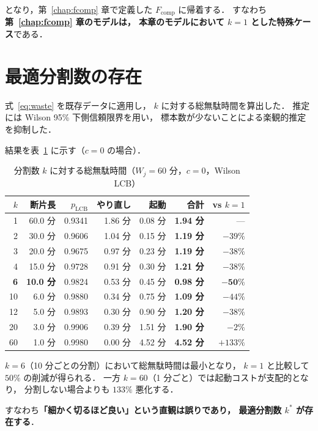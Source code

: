 \documentclass[11pt,a4paper]{ltjsreport}
\newcommand{\Fcomp}{F_{\mathrm{comp}}}
\begin{document}
となり，第~\ref{chap:fcomp} 章で定義した $\Fcomp$ に帰着する．
すなわち\textbf{第~\ref{chap:fcomp} 章のモデルは，
本章のモデルにおいて $k=1$ とした特殊ケース}である．

\section{最適分割数の存在}
\label{sec:kstar}

式~\eqref{eq:waste} を既存データに適用し，
$k$ に対する総無駄時間を算出した．
推定には Wilson 95\% 下側信頼限界を用い，
標本数が少ないことによる楽観的推定を抑制した．

結果を表~\ref{tab:ucurve} に示す（$c = 0$ の場合）．

\begin{table}[htbp]
\centering
\caption{分割数 $k$ に対する総無駄時間（$W_j = 60$ 分，$c = 0$，Wilson LCB）}
\label{tab:ucurve}
\small
\begin{tabular}{@{}rrrrrrr@{}}
\toprule
$k$ & 断片長 & $p_{\mathrm{LCB}}$ & やり直し & 起動 & \textbf{合計} & vs $k{=}1$ \\
\midrule
1  & 60.0 分 & 0.9341 & 1.86 分 & 0.08 分 & \textbf{1.94 分} & --- \\
2  & 30.0 分 & 0.9606 & 1.04 分 & 0.15 分 & \textbf{1.19 分} & $-39\%$ \\
3  & 20.0 分 & 0.9675 & 0.97 分 & 0.23 分 & \textbf{1.19 分} & $-38\%$ \\
4  & 15.0 分 & 0.9728 & 0.91 分 & 0.30 分 & \textbf{1.21 分} & $-38\%$ \\
\textbf{6}  & \textbf{10.0 分} & 0.9824 & 0.53 分 & 0.45 分 & \textbf{0.98 分} & $\mathbf{-50\%}$ \\
10 & 6.0 分  & 0.9880 & 0.34 分 & 0.75 分 & \textbf{1.09 分} & $-44\%$ \\
12 & 5.0 分  & 0.9893 & 0.30 分 & 0.90 分 & \textbf{1.20 分} & $-38\%$ \\
20 & 3.0 分  & 0.9906 & 0.39 分 & 1.51 分 & \textbf{1.90 分} & $-2\%$ \\
60 & 1.0 分  & 0.9980 & 0.00 分 & 4.52 分 & \textbf{4.52 分} & $+133\%$ \\
\bottomrule
\end{tabular}
\end{table}

$k = 6$（10 分ごとの分割）において総無駄時間は最小となり，
$k=1$ と比較して $50\%$ の削減が得られる．
一方 $k = 60$（1 分ごと）では起動コストが支配的となり，
分割しない場合よりも $133\%$ 悪化する．

すなわち\textbf{「細かく切るほど良い」という直観は誤りであり，
最適分割数 $k^{*}$ が存在する}．
\end{document}
